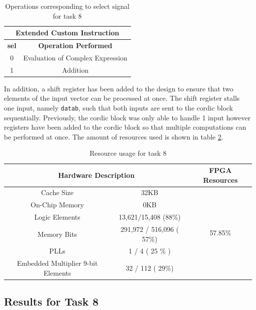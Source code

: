 \documentclass{article}
\begin{document}
\begin{table}[H]
  \centering
    \begin{tabular}{|c|c|}
    \hline
    \multicolumn{2}{|c|}{\textbf{Extended Custom Instruction}}\\
    \hline
    \textbf{sel} & \textbf{Operation Performed} \\
    \hline
    0    & Evaluation of Complex Expression \\
    \hline
    1    & Addition \\
    \hline
    \end{tabular}%
  \caption{Operations corresponding to select signal for task 8}
  \label{tab:task8_select}%
\end{table}%

In addition, a shift register has been added to the design to ensure that two elements of the input vector can be processed at once. The shift register stalls one input, namely {\tt datab}, such that both inputs are sent to the cordic block sequentially. Previously, the cordic block was only able to handle 1 input however registers have been added to the cordic block so that multiple computations can be performed at once. The amount of resources used is shown in table \ref{tab:task8_resources}.

\begin{table}[H]
  \centering
    \begin{tabular}{|c|c|c|}
    \hline
    \multicolumn{2}{|c|}{\textbf{Hardware Description}} & \textbf{FPGA Resources} \\
    \hline
    Cache Size & 32KB  & \multirow{6}{*}{57.85\%} \\
\cline{1-2}    On-Chip Memory & 0KB   &  \\
\cline{1-2}    Logic Elements & 13,621/15,408 (88\%) &  \\
\cline{1-2}    Memory Bits & 291,972 / 516,096 ( 57\%) &  \\
\cline{1-2}    PLLs  & 1 / 4 ( 25 \% ) &  \\
\cline{1-2}    Embedded Multiplier 9-bit Elements & 32 / 112 ( 29\%) &  \\
    \hline
    \end{tabular}%
  \caption{Resource usage for task 8}
  \label{tab:task8_resources}%
\end{table}%

\newpage
\subsection{Results for Task 8}
\end{document}
